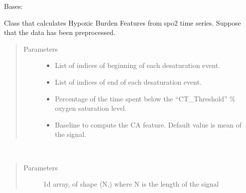 \documentclass[letterpaper,10pt,english]{sphinxmanual}
\begin{document}
\begin{fulllineitems}
\label{\detokenize{pobm.obm:pobm.obm.burden.HypoxicBurdenMeasures}}
Bases: 

Class that calculates Hypoxic Burden Features from spo2 time series.
Suppose that the data has been preprocessed.
\begin{quote}\begin{description}
\item[{Parameters}] \leavevmode\begin{itemize}
\item {} 
 \textendash{} List of indices of beginning of each desaturation event.

\item {} 
 \textendash{} List of indices of end of each desaturation event.

\item {} 
 \textendash{} Percentage of the time spent below the “CT\_Threshold” \% oxygen saturation level.

\item {} 
 \textendash{} Baseline to compute the CA feature. Default value is mean of the signal.

\end{itemize}

\end{description}\end{quote}

\begin{fulllineitems}
\label{\detokenize{pobm.obm:pobm.obm.burden.HypoxicBurdenMeasures.compute}}~\begin{quote}\begin{description}
\item[{Parameters}] \leavevmode
{} \textendash{} 1\sphinxhyphen{}d array, of shape (N,) where N is the length of the signal


\end{description}
\end{quote}
\end{fulllineitems}
\end{fulllineitems}
\end{document}
